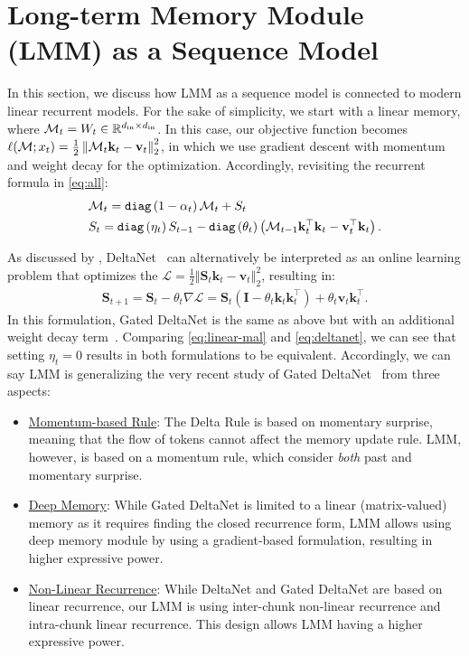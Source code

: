 \section{Long-term Memory Module (LMM) as a Sequence Model}\label{app:MAS}
In this section, we discuss how LMM as a sequence model is connected to modern linear recurrent models. For the sake of simplicity, we start with a linear memory, where $\mathcal{M}_t = W_t \in \mathbb{R}^{d_{\text{in}} \times d_{\text{in}}}$. In this case, our objective function becomes $\ell(\mathcal{M}; x_t) = \frac{1}{2}\left\Vert \mathcal{M}_{t}\mathbf{k}_t - \mathbf{v}_t  \right \Vert_2^2$, in which we use gradient descent with momentum and weight decay for the optimization. Accordingly, revisiting the recurrent formula in \autoref{eq:all}:   
\begin{align}\label{eq:linear-mal}
    &\M_t =  \texttt{diag}\left(1 - \alpha_t\right)\M_t + S_t \\
    &S_t = \texttt{diag}\left(\eta_t \right)S_{t-1} - \texttt{diag}\left(\theta_t \right) \left( \M_{t-1} \mathbf{k}_t^\top \mathbf{k}_t - \mathbf{v}_t^{\top} \mathbf{k}_t \right).
\end{align}

 As discussed by \citet{yang2024gated}, DeltaNet~\citep{yang2024parallelizing} can alternatively be interpreted as an online learning problem that optimizes the $\mathcal{L} = \frac{1}{2}\left\Vert \mathbf{S}_{t}\mathbf{k}_t - \mathbf{v}_t  \right \Vert_2^2$, resulting in:
\begin{align}\label{eq:deltanet}
    \mathbf{S}_{t+1} = \mathbf{S}_{t} - \theta_t \nabla \mathcal{L} = \mathbf{S}_{t} \left( \mathbf{I} - \theta_t \mathbf{k}_t\mathbf{k}_t^{\top} \right) + \theta_t \mathbf{v}_t\mathbf{k}^{\top}_t.
\end{align}
In this formulation, Gated DeltaNet is the same as above but with an additional weight decay term~\citep{yang2024gated}. Comparing \autoref{eq:linear-mal} and \autoref{eq:deltanet}, we can see that setting $\eta_t = 0$ results in both formulations to be equivalent. Accordingly, we can say LMM is generalizing the very recent study of Gated DeltaNet~\citep{yang2024gated} from three aspects: 
\begin{itemize}
    \item \underline{Momentum-based Rule}: The Delta Rule is based on momentary surprise, meaning that the flow of tokens cannot affect the memory update rule. LMM, however, is based on a momentum rule, which consider \emph{both} past and momentary surprise.
    \item \underline{Deep Memory}: While Gated DeltaNet is limited to a linear (matrix-valued) memory as it requires finding the closed recurrence form, LMM allows using deep memory module by using a gradient-based formulation, resulting in higher expressive power.
    \item \underline{Non-Linear Recurrence}: While DeltaNet and Gated DeltaNet are based on linear recurrence, our LMM is using inter-chunk non-linear recurrence and intra-chunk  linear recurrence. This design allows LMM having a higher expressive power.
\end{itemize}

